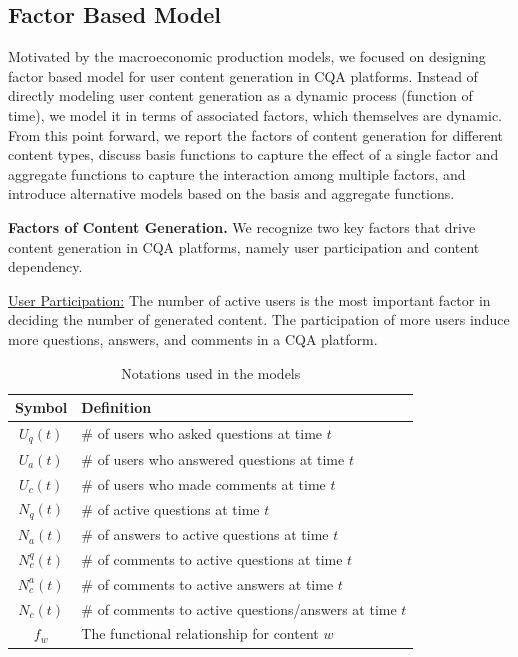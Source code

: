\subsection{Factor Based Model} 
Motivated by the macroeconomic production models, we focused on designing factor based model for user content generation in CQA platforms. Instead of directly modeling user content generation as a dynamic process (function of time), we model it in terms of associated factors, which themselves are dynamic. From this point forward, we report the factors of content generation for different content types, discuss basis functions to capture the effect of a single factor and aggregate functions to capture the interaction among multiple factors, and introduce alternative models based on the basis and aggregate functions.

\textbf{Factors of Content Generation.} We recognize two key factors that drive content generation in CQA platforms, namely user participation and content dependency.

\uline{User Participation:} The number of active users is the most important factor in deciding the number of generated content. The participation of more users induce more questions, answers, and comments in a CQA platform.

\begin{table}[thb]
	\centering
	\begin{tabular}{cl}
	\hline
	\textbf{Symbol} & \textbf{Definition}\\ \hline
	$U_q(t)$ & \# of users who asked questions at time $t$\\ 
	$U_a(t)$ & \# of users who answered questions at time $t$\\
	$U_c(t)$ & \# of users who made comments at time $t$\\
	$N_q(t)$ & \# of active questions at time $t$\\
	$N_a(t)$ & \# of answers to active questions at time $t$\\
	$N_c^q(t)$ & \# of comments to active questions at time $t$\\
	$N_c^a(t)$ & \# of comments to active answers at time $t$\\
    $N_c(t)$ & \# of comments to active questions/answers at time $t$\\
	$f_w$ & The functional relationship for content $w$\\ \hline
	 \end{tabular}
    \caption{Notations used in the models}
    \label{tab:notations}
\end{table}

